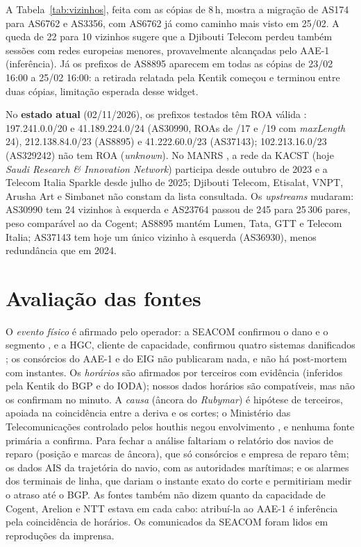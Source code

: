 \documentclass[12pt]{article}
\begin{document}
A Tabela~\ref{tab:vizinhos}, feita com as cópias de 8\,h, mostra a migração de AS174
para AS6762 e AS3356, com AS6762 já como caminho mais visto em 25/02. A queda de 22 para 10
vizinhos sugere que a Djibouti Telecom perdeu também sessões com redes europeias menores,
provavelmente alcançadas pelo AAE-1 (inferência). Já os prefixos de AS8895 aparecem em
todas as cópias de 23/02 16:00 a 25/02 16:00: a retirada relatada pela Kentik começou e
terminou entre duas cópias, limitação esperada desse widget.

No \textbf{estado atual} (02/11/2026), os prefixos testados têm ROA válida \cite{rfc6811}:
197.241.0.0/20 e 41.189.224.0/24 (AS30990, ROAs de /17 e /19 com \textit{maxLength} 24),
212.138.84.0/23 (AS8895) e 41.222.60.0/23 (AS37143); 102.213.16.0/23 (AS329242) não tem ROA
(\textit{unknown}). No MANRS \cite{manrs2026}, a rede da KACST (hoje \textit{Saudi Research
\& Innovation Network}) participa desde outubro de 2023 e a Telecom Italia Sparkle desde
julho de 2025; Djibouti Telecom, Etisalat, VNPT, Arusha Art e Simbanet não constam da
lista consultada. Os \textit{upstreams} mudaram: AS30990 tem 24 vizinhos à esquerda e
AS23764 passou de 245 para 25\,306 pares, peso comparável ao da Cogent; AS8895 mantém
Lumen, Tata, GTT e Telecom Italia; AS37143 tem hoje um único vizinho à esquerda (AS36930),
menos redundância que em 2024.

\section{Avalia\c{c}\~ao das fontes}
\label{sec:fontes}

O \emph{evento físico} é afirmado pelo operador: a SEACOM confirmou o dano e o segmento
\cite{seacom2024a}, e a HGC, cliente de capacidade, confirmou quatro sistemas danificados
\cite{hgc2024b}; os consórcios do AAE-1 e do EIG não publicaram nada, e não há post-mortem
com instantes. Os \emph{horários} são afirmados por terceiros com evidência (inferidos pela
Kentik do BGP e do IODA); nossos dados horários são compatíveis, mas não os confirmam no
minuto. A \emph{causa} (âncora do \textit{Rubymar}) é hipótese de terceiros, apoiada na
coincidência entre a deriva e os cortes; o Ministério das Telecomunicações controlado pelos
houthis negou envolvimento \cite{madory2024}, e nenhuma fonte primária a confirma. Para
fechar a análise faltariam o relatório dos navios de reparo (posição e marcas de âncora),
que só consórcios e empresa de reparo têm; os dados AIS da trajetória do navio, com as
autoridades marítimas; e os alarmes dos terminais de linha, que dariam o instante exato do
corte e permitiriam medir o atraso até o BGP. As fontes também não dizem quanto da
capacidade de Cogent, Arelion e NTT estava em cada cabo: atribuí-la ao AAE-1 é inferência
pela coincidência de horários. Os comunicados da SEACOM foram lidos em reproduções da imprensa.
\end{document}
